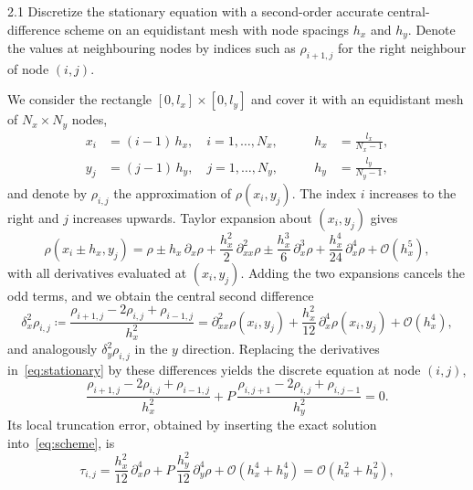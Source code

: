 \documentclass[11pt,a4paper]{article}
\numberwithin{equation}{section}
\theoremstyle{definition}
\theoremstyle{remark}
\newcommand{\bigO}[1]{\mathcal{O}\!\left(#1\right)}
\begin{document}
\begin{task}{2.1}
  Discretize the stationary equation with a second-order accurate central-difference
  scheme on an equidistant mesh with node spacings $h_x$ and $h_y$. Denote the values at
  neighbouring nodes by indices such as $\rho_{i+1,j}$ for the right neighbour of node
  $(i,j)$.
\end{task}

We consider the rectangle $[0, l_x]\times[0, l_y]$ and cover it with an equidistant mesh
of $N_x \times N_y$ nodes,
\begin{equation}\label{eq:mesh}
  \begin{aligned}
    x_i &= (i - 1)\,h_x, \quad i = 1,\dots,N_x,
    &\qquad
    h_x &= \frac{l_x}{N_x - 1},\\
    y_j &= (j - 1)\,h_y, \quad j = 1,\dots,N_y,
    &\qquad
    h_y &= \frac{l_y}{N_y - 1},
  \end{aligned}
\end{equation}
and denote by $\rho_{i,j}$ the approximation of $\rho(x_i, y_j)$. The index $i$ increases
to the right and $j$ increases upwards. Taylor expansion about $(x_i, y_j)$ gives
\begin{equation}\label{eq:taylor}
  \rho(x_i \pm h_x, y_j)
  = \rho \pm h_x\,\partial_x\rho + \frac{h_x^2}{2}\,\partial^2_{xx}\rho
  \pm \frac{h_x^3}{6}\,\partial^3_{x}\rho + \frac{h_x^4}{24}\,\partial^4_{x}\rho
  + \bigO{h_x^5},
\end{equation}
with all derivatives evaluated at $(x_i, y_j)$. Adding the two expansions cancels the odd
terms, and we obtain the central second difference
\begin{equation}\label{eq:central}
  \delta^2_x\rho_{i,j}
  \coloneqq \frac{\rho_{i+1,j} - 2\rho_{i,j} + \rho_{i-1,j}}{h_x^2}
  = \partial^2_{xx}\rho(x_i, y_j) + \frac{h_x^2}{12}\,\partial^4_x\rho(x_i, y_j)
  + \bigO{h_x^4},
\end{equation}
and analogously $\delta^2_y\rho_{i,j}$ in the $y$ direction. Replacing the derivatives
in~\eqref{eq:stationary} by these differences yields the discrete equation at node
$(i,j)$,
\begin{equation}\label{eq:scheme}
  \frac{\rho_{i+1,j} - 2\rho_{i,j} + \rho_{i-1,j}}{h_x^2}
  + P\,\frac{\rho_{i,j+1} - 2\rho_{i,j} + \rho_{i,j-1}}{h_y^2} = 0.
\end{equation}
Its local truncation error, obtained by inserting the exact solution
into~\eqref{eq:scheme}, is
\begin{equation}\label{eq:truncation}
  \tau_{i,j}
  = \frac{h_x^2}{12}\,\partial^4_x\rho + P\,\frac{h_y^2}{12}\,\partial^4_y\rho
  + \bigO{h_x^4 + h_y^4}
  = \bigO{h_x^2 + h_y^2},
\end{equation}
\end{document}
